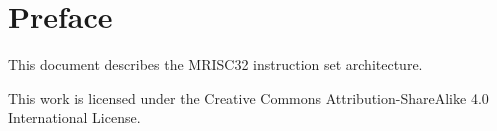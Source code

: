 %

\chapter{Preface}

This document describes the MRISC32 instruction set architecture.

This work is licensed under the Creative Commons Attribution-ShareAlike 4.0
International License.

